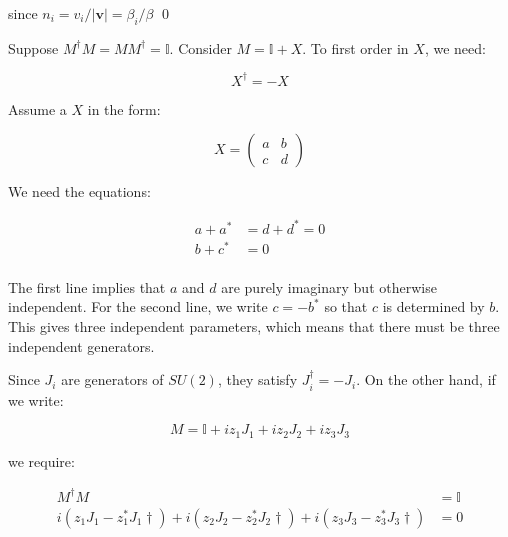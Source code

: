 \documentclass[12pt]{article}
\begin{document}
since $n_{i} = v_{i}/\left\lvert \mathbf{v} \right\rvert = \beta_{i}/\beta$
\qed



Suppose $M^{\dagger}M = MM^{\dagger} = \mathbb{I}$. Consider $M = \mathbb{I} + X$. To first order in $X$, we need:

\begin{equation}
    X^{\dagger} = -X
\end{equation}

Assume a $X$ in the form:

\begin{equation}
    X =
    \begin{pmatrix}
        a & b \\
        c & d
    \end{pmatrix}
\end{equation}

We need the equations:

\begin{equation}
    \begin{split}
        a + a^{*} &= d + d^{*} = 0 \\
        b + c^{*} &= 0 \\
    \end{split}
\end{equation}

The first line implies that $a$ and $d$ are purely imaginary but otherwise independent. For the second line, we write $c = -b^{*}$ so that $c$ is determined by $b$. This gives three independent parameters, which means that there must be three independent generators.

Since $J_{i}$ are generators of $SU(2)$, they satisfy $J_{i}^{\dagger} = -J_{i}$. On the other hand, if we write:

\begin{equation}
    M = \mathbb{I} + i z_{1} J_{1} + i z_{2} J_{2} + i z_{3} J_{3}
\end{equation}

we require:

\begin{equation}
    \begin{split}
        M^{\dagger}M &= \mathbb{I} \\
        i(z_{1}J_{1} - z_{1}^{*}J_{1}\dagger) + i(z_{2}J_{2} - z_{2}^{*}J_{2}\dagger) + i(z_{3}J_{3} - z_{3}^{*}J_{3}\dagger) &= 0
    \end{split}
\end{equation}
\end{document}
